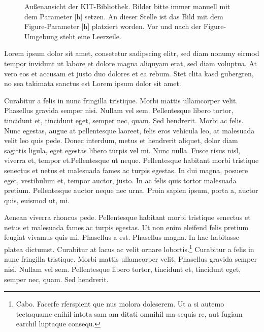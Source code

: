 \begin{figure}[h]
{	}
\hfill %
	\caption{Außenansicht der KIT-Bibliothek. Bilder bitte immer manuell mit dem Parameter [h] setzen.	An dieser Stelle ist das Bild mit dem Figure-Parameter [h] platziert worden. Vor und nach der Figure-Umgebung steht eine Leerzeile.}
	\label{fig:bib4}
\end{figure}

Lorem ipsum dolor sit amet, consetetur sadipscing elitr, sed diam nonumy eirmod tempor invidunt ut labore et dolore magna aliquyam erat, sed diam voluptua. At vero eos et accusam et justo duo dolores et ea rebum. Stet clita kasd gubergren, no sea takimata sanctus est Lorem ipsum dolor sit amet.

Curabitur a felis in nunc fringilla tristique. Morbi mattis ullamcorper velit. Phasellus gravida semper nisi. Nullam vel sem. Pellentesque libero tortor, tincidunt et, tincidunt eget, semper nec, quam. Sed hendrerit. Morbi ac felis. Nunc egestas, augue at pellentesque laoreet, felis eros vehicula leo, at malesuada velit leo quis pede. Donec interdum, metus et hendrerit aliquet, dolor diam sagittis ligula, eget egestas libero turpis vel mi. Nunc nulla. Fusce risus nisl, viverra et, tempor et.Pellentesque ut neque. Pellentesque habitant morbi tristique senectus et netus et malesuada fames ac turpis egestas. In dui magna, posuere eget, vestibulum et, tempor auctor, justo. In ac felis quis tortor malesuada pretium. Pellentesque auctor neque nec urna. Proin sapien ipsum, porta a, auctor quis, euismod ut, mi.

Aenean viverra rhoncus pede. Pellentesque habitant morbi tristique senectus et netus et malesuada fames ac turpis egestas. Ut non enim eleifend felis pretium feugiat vivamus quis mi. Phasellus a est. Phasellus magna. In hac habitasse platea dictumst. Curabitur at lacus ac velit ornare lobortis.\footnote{Cabo. Facerfe rferspient que nus molora doleserem. Ut a si autemo tectaquame enihil intota sam am ditati omnihil ma sequis re, aut fugiam earchil luptaque consequ.} Curabitur a felis in nunc fringilla tristique. Morbi mattis ullamcorper velit. Phasellus gravida semper nisi. Nullam vel sem. Pellentesque libero tortor, tincidunt et, tincidunt eget, semper nec, quam. Sed hendrerit.

